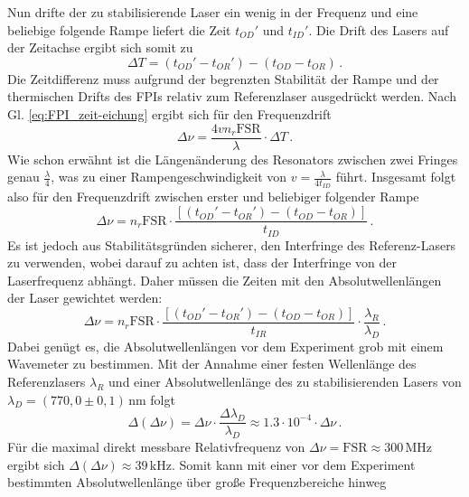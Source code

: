 Nun drifte der zu stabilisierende Laser ein wenig in der Frequenz und eine
beliebige folgende Rampe liefert die Zeit $t_{OD}'$ und $t_{ID}'$. Die Drift des
Lasers auf der Zeitachse ergibt sich somit zu
\begin{equation}\label{eq:FPI_zeitdrift}
	\Delta T=\left(t_{OD}'-t_{OR}'\right)-\left(t_{OD}-t_{OR}\right)\,.
\end{equation}
Die Zeitdifferenz muss aufgrund der begrenzten Stabilität der Rampe und der
thermischen Drifts des FPIs relativ zum Referenzlaser ausgedrückt werden. Nach
Gl.
\eqref{eq:FPI_zeit-eichung} ergibt sich für den Frequenzdrift
\begin{equation}\label{eq:FPI_frequenzdrift_01}
	\Delta\nu=\frac{4vn_r\text{FSR}}{\lambda}\cdot\Delta T\,.
\end{equation}
Wie schon erwähnt ist die Längenänderung des Resonators zwischen zwei Fringes
genau $\frac{\lambda}{4}$, was zu einer Rampengeschwindigkeit von
$v=\frac{\lambda}{4t_{ID}}$ führt. Insgesamt folgt also für den Frequenzdrift
zwischen erster und beliebiger folgender Rampe
\begin{equation}\label{eq:FPI_frequenzdrift_02}
	\Delta\nu=n_r\text{FSR}\cdot\frac{\left[\left(t_{OD}'-t_{OR}'\right)-\left(t_{OD}-t_{OR}\right)\right]}{t_{ID}}\,.
\end{equation}
Es ist jedoch aus Stabilitätsgründen sicherer, den Interfringe des
Referenz-Lasers zu verwenden, wobei darauf zu achten ist, dass der Interfringe
von der Laserfrequenz abhängt. Daher müssen die Zeiten mit den
Absolutwellenlängen der Laser gewichtet werden:
\begin{equation}\label{eq:FPI_frequenzdrift_03}
	\Delta\nu=n_r\text{FSR}\cdot\frac{\left[\left(t_{OD}'-t_{OR}'\right)-\left(t_{OD}-t_{OR}\right)\right]}{t_{IR}}\cdot\frac{\lambda_R}{\lambda_D}\,.
\end{equation}
Dabei genügt es, die Absolutwellenlängen vor dem Experiment grob mit einem
Wavemeter zu bestimmen. Mit der Annahme einer festen Wellenlänge
des Referenzlasers $\lambda_R$ und einer Absolutwellenlänge
des zu stabilisierenden Lasers von $\lambda_D=(770,0\pm0,1)\,$nm folgt
\begin{equation}\label{eq:FPI_frequenzdrift_fehler}
	\Delta(\Delta\nu)=\Delta\nu\cdot\frac{\Delta\lambda_D}{\lambda_D}\approx1.3\cdot10^{-4}\cdot\Delta\nu\,.
\end{equation}
Für die maximal direkt messbare Relativfrequenz von
$\Delta\nu=\text{FSR}\approx300\,$MHz ergibt sich
$\Delta(\Delta\nu)\approx39\,$kHz. Somit kann mit einer vor
dem Experiment bestimmten Absolutwellenlänge über große Frequenzbereiche hinweg
